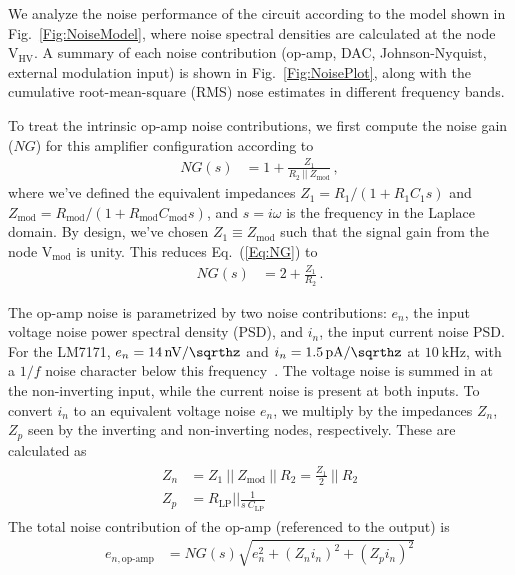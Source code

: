 \documentclass[aip,rsi,reprint]{revtex4-1} %
\newcommand{\epar}{~||~} %
\begin{document}
We analyze the noise performance of the circuit according to the model shown in Fig.~\ref{Fig:NoiseModel}, where noise spectral densities are calculated at the node $\text{V}_\text{HV}$.
A summary of each noise contribution (op-amp, DAC, Johnson-Nyquist, external modulation input) is shown in Fig.~\ref{Fig:NoisePlot}, along with the cumulative root-mean-square (RMS) nose estimates in different frequency bands.

To treat the intrinsic op-amp noise contributions, we first compute the noise gain ($NG$) for this amplifier configuration according to
\begin{align}
\label{Eq:NG}
NG(s) &= 1 + \frac{Z_1}{R_2 \epar Z_{\text{mod}}}\,,
\end{align}
where we've defined the equivalent impedances $Z_1 = R_1/(1+R_1 C_1 s)$ and $Z_{\text{mod}} = R_{\text{mod}}/(1+R_{\text{mod}} C_{\text{mod}} s)$, and $s = i\omega$ is the frequency in the Laplace domain.
By design, we've chosen $Z_1 \equiv Z_{\text{mod}}$ such that the signal gain from the node $\text{V}_{\text{mod}}$ is unity.
This reduces Eq.~(\ref{Eq:NG}) to
\begin{align}
\label{Eq:RedNG}
NG(s) &= 2 + \frac{Z_1}{R_2}\,.
\end{align}

The op-amp noise is parametrized by two noise contributions: $e_n$, the input voltage noise power spectral density (PSD), and $i_n$, the input current noise PSD.
For the LM7171, $e_n = \SI[per-mode=symbol]{14}{\nano\volt\per\sqrthz}$ and $i_n = \SI[per-mode=symbol]{1.5}{\pico\ampere\per\sqrthz}$ at $\SI{10}{\kilo\hertz}$, with a $1/f$ noise character below this frequency~\cite{LM7171Datasheet}.
The voltage noise is summed in at the non-inverting input, while the current noise is present at both inputs.
To convert $i_n$ to an equivalent voltage noise $e_n$, we multiply by the impedances $Z_n$, $Z_p$ seen by the inverting and non-inverting nodes, respectively.
These are calculated as
\begin{align}
\begin{split}
\label{Eq:ZnZp}
Z_n &= Z_1 \epar Z_{\text{mod}} \epar  R_2   = \frac{Z_1}{2} \epar R_2 \\
Z_p &= R_{\text{LP}}  \big|\big|\frac{1}{s~C_{\text{LP}}}
\end{split}
\end{align}
The total noise contribution of the op-amp (referenced to the output) is
\begin{align}
\label{Eq:OpAmpNoise}
e_{n,\text{op-amp}} &= NG(s)\sqrt{e_n^2 + (Z_n i_n)^2 + (Z_p i_n)^2}
\end{align}
\end{document}
